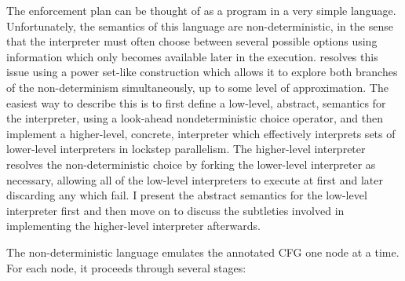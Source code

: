 
The enforcement plan can be thought of as a program in a very simple
language.  Unfortunately, the semantics of this language are
non-deterministic, in the sense that the interpreter must often choose
between several possible options using information which only becomes
available later in the execution.  {\Technique} resolves this issue
using a power set-like construction which allows it to explore both branches of the
non-determinism simultaneously, up to some level of
approximation.  The easiest way to describe this is to first define a
low-level, abstract, semantics for the interpreter, using a look-ahead
nondeterministic choice operator, and then implement a higher-level,
concrete, interpreter which effectively interprets sets of lower-level
interpreters in lockstep parallelism.  The higher-level interpreter
resolves the non-deterministic choice by forking the lower-level
interpreter as necessary, allowing all of the low-level interpreters
to execute at first and later discarding any which fail.  I present
the abstract semantics for the low-level interpreter first and then
move on to discuss the subtleties involved in implementing the
higher-level interpreter afterwards.

The non-deterministic language emulates the annotated CFG one node at
a time.  For each node, it proceeds through several stages:

